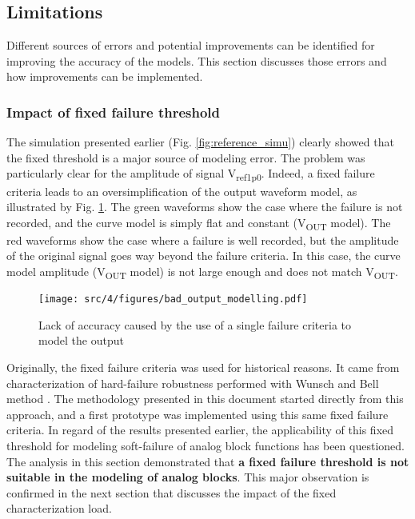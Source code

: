 \subsection{Limitations}
\label{sec:current-limitations}

Different sources of errors and potential improvements can be identified for improving the accuracy of the models.
This section discusses those errors and how improvements can be implemented.

\subsubsection{Impact of fixed failure threshold}
\label{sec:fixed-failure-threshold}

The simulation presented earlier (Fig. \ref{fig:reference_simu}) clearly showed that the fixed threshold is a major source of modeling error.
The problem was particularly clear for the amplitude of signal V\textsubscript{ref1p0}.
Indeed, a fixed failure criteria leads to an oversimplification of the output waveform model, as illustrated by Fig. \ref{fig:impact-single-failure-criteria}.
The green waveforms show the case where the failure is not recorded, and the curve model is simply flat and constant (V\textsubscript{OUT} model).
The red waveforms show the case where a failure is well recorded, but the amplitude of the original signal goes way beyond the failure criteria.
In this case, the curve model amplitude (V\textsubscript{OUT} model) is not large enough and does not match V\textsubscript{OUT}.

\begin{figure}[!h]
  \centering
  \texttt{[image: src/4/figures/bad\_output\_modelling.pdf]}
  \caption{Lack of accuracy caused by the use of a single failure criteria to model the output}
  \label{fig:impact-single-failure-criteria}
\end{figure}

%
Originally, the fixed failure criteria was used for historical reasons.
It came from characterization of hard-failure robustness performed with Wunsch and Bell method \cite{wunsch-bell}.
The methodology presented in this document started directly from this approach, and a first prototype was implemented using this same fixed failure criteria.
In regard of the results presented earlier, the applicability of this fixed threshold for modeling soft-failure of analog block functions has been questioned.
The analysis in this section demonstrated that \textbf{a fixed failure threshold is not suitable in the modeling of analog blocks}.
This major observation is confirmed in the next section that discusses the impact of the fixed characterization load.

